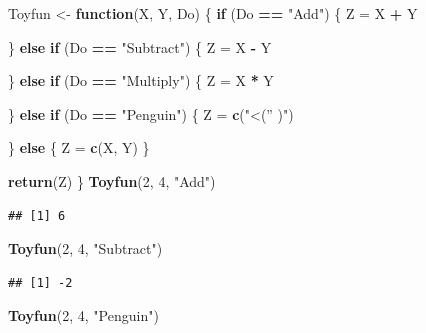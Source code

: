 \documentclass[
]{book}
\newenvironment{Shaded}{\begin{snugshade}}{\end{snugshade}}
\newcommand{\ControlFlowTok}[1]{\textcolor[rgb]{0.13,0.29,0.53}{\textbf{#1}}}
\newcommand{\DecValTok}[1]{\textcolor[rgb]{0.00,0.00,0.81}{#1}}
\newcommand{\KeywordTok}[1]{\textcolor[rgb]{0.13,0.29,0.53}{\textbf{#1}}}
\newcommand{\NormalTok}[1]{#1}
\newcommand{\OperatorTok}[1]{\textcolor[rgb]{0.81,0.36,0.00}{\textbf{#1}}}
\newcommand{\StringTok}[1]{\textcolor[rgb]{0.31,0.60,0.02}{#1}}
\begin{document}
\begin{Shaded}
\begin{Highlighting}[]
\NormalTok{Toyfun <-}\StringTok{ }\ControlFlowTok{function}\NormalTok{(X,}
\NormalTok{    Y, Do) \{}
    \ControlFlowTok{if}\NormalTok{ (Do }\OperatorTok{==}\StringTok{ "Add"}\NormalTok{) \{}
\NormalTok{        Z =}\StringTok{ }\NormalTok{X }\OperatorTok{+}\StringTok{ }\NormalTok{Y}

\NormalTok{    \} }\ControlFlowTok{else} \ControlFlowTok{if}\NormalTok{ (Do }\OperatorTok{==}\StringTok{ "Subtract"}\NormalTok{) \{}
\NormalTok{        Z =}\StringTok{ }\NormalTok{X }\OperatorTok{-}\StringTok{ }\NormalTok{Y}

\NormalTok{    \} }\ControlFlowTok{else} \ControlFlowTok{if}\NormalTok{ (Do }\OperatorTok{==}\StringTok{ "Multiply"}\NormalTok{) \{}
\NormalTok{        Z =}\StringTok{ }\NormalTok{X }\OperatorTok{*}\StringTok{ }\NormalTok{Y}

\NormalTok{    \} }\ControlFlowTok{else} \ControlFlowTok{if}\NormalTok{ (Do }\OperatorTok{==}\StringTok{ "Penguin"}\NormalTok{) \{}
\NormalTok{        Z =}\StringTok{ }\KeywordTok{c}\NormalTok{(}\StringTok{"<('' )"}\NormalTok{)}

\NormalTok{    \} }\ControlFlowTok{else}\NormalTok{ \{}
\NormalTok{        Z =}\StringTok{ }\KeywordTok{c}\NormalTok{(X, Y)}
\NormalTok{    \}}

    \KeywordTok{return}\NormalTok{(Z)}
\NormalTok{\}}
\KeywordTok{Toyfun}\NormalTok{(}\DecValTok{2}\NormalTok{, }\DecValTok{4}\NormalTok{, }\StringTok{"Add"}\NormalTok{)}
\end{Highlighting}
\end{Shaded}

\begin{verbatim}
## [1] 6
\end{verbatim}

\begin{Shaded}
\begin{Highlighting}[]
\KeywordTok{Toyfun}\NormalTok{(}\DecValTok{2}\NormalTok{, }\DecValTok{4}\NormalTok{, }\StringTok{"Subtract"}\NormalTok{)}
\end{Highlighting}
\end{Shaded}

\begin{verbatim}
## [1] -2
\end{verbatim}

\begin{Shaded}
\begin{Highlighting}[]
\KeywordTok{Toyfun}\NormalTok{(}\DecValTok{2}\NormalTok{, }\DecValTok{4}\NormalTok{, }\StringTok{"Penguin"}\NormalTok{)}
\end{Highlighting}
\end{Shaded}
\end{document}

